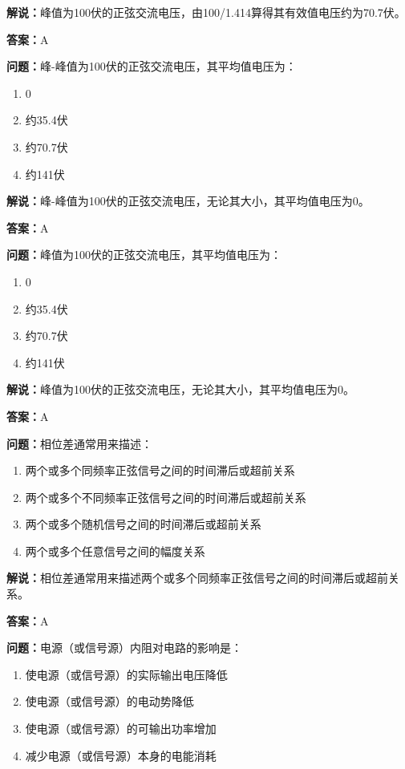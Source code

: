 \textbf{解说：}峰值为100伏的正弦交流电压，由100/1.414算得其有效值电压约为70.7伏。

\textbf{答案：}A

\textbf{问题：}峰-峰值为100伏的正弦交流电压，其平均值电压为：

\begin{enumerate}[label=\Alph*), leftmargin=3em]
	\item 0
	\item 约35.4伏
	\item 约70.7伏
	\item 约141伏
\end{enumerate}

\textbf{解说：}峰-峰值为100伏的正弦交流电压，无论其大小，其平均值电压为0。

\textbf{答案：}A

\textbf{问题：}峰值为100伏的正弦交流电压，其平均值电压为：

\begin{enumerate}[label=\Alph*), leftmargin=3em]
	\item 0
	\item 约35.4伏
	\item 约70.7伏
	\item 约141伏
\end{enumerate}

\textbf{解说：}峰值为100伏的正弦交流电压，无论其大小，其平均值电压为0。

\textbf{答案：}A

\textbf{问题：}相位差通常用来描述：

\begin{enumerate}[label=\Alph*), leftmargin=3em]
	\item 两个或多个同频率正弦信号之间的时间滞后或超前关系
	\item 两个或多个不同频率正弦信号之间的时间滞后或超前关系
	\item 两个或多个随机信号之间的时间滞后或超前关系
	\item 两个或多个任意信号之间的幅度关系
\end{enumerate}

\textbf{解说：}相位差通常用来描述两个或多个同频率正弦信号之间的时间滞后或超前关系。

\textbf{答案：}A

\textbf{问题：}电源（或信号源）内阻对电路的影响是：

\begin{enumerate}[label=\Alph*), leftmargin=3em]
	\item 使电源（或信号源）的实际输出电压降低
	\item 使电源（或信号源）的电动势降低
	\item 使电源（或信号源）的可输出功率增加
	\item 减少电源（或信号源）本身的电能消耗
\end{enumerate}

